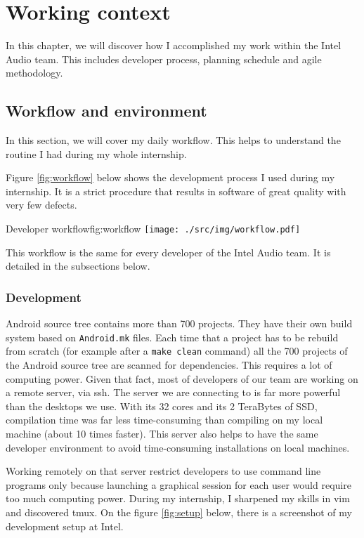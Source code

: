 \chapter{Working context}\label{chap:organisation}

In this chapter, we will discover how I accomplished my work within the Intel Audio team.
This includes developer process, planning schedule and agile methodology.

\section{Workflow and environment}
In this section, we will cover my daily workflow. This helps
to understand the routine I had during my whole internship.

Figure \ref{fig:workflow} below shows the development process I used during my internship.
It is a strict procedure that results in software of great quality with very few defects.

\begin{figureGraphics}{Developer workflow}{fig:workflow}
    \texttt{[image: ./src/img/workflow.pdf]}
\end{figureGraphics}

This workflow is the same for every developer of the Intel Audio team. It is
detailed in the subsections below.

\subsection{Development}
Android source tree contains more than 700 projects. They have their own build system
based on \lstinline{Android.mk} files. Each time that a project has to be rebuild from scratch (for example after a  \lstinline{make clean} command) all
the 700 projects of the Android source tree are scanned for dependencies. This requires a lot of computing power.
Given that fact, most of developers of our team are working on a remote server, via ssh.
The server we are connecting to is far more powerful than the desktops we use.
With its 32 cores and its 2 TeraBytes of SSD, compilation time was far less time-consuming
than compiling on my local machine (about 10 times faster).
This server also helps to have the same developer environment to avoid
time-consuming installations on local machines.

Working remotely on that server restrict developers to use command line programs only because
launching a graphical session for each user would require too much computing power.
During my internship, I sharpened my skills in \gls{vim} and discovered \gls{tmux}.
On the figure \ref{fig:setup} below, there is a screenshot of my development setup at Intel.

